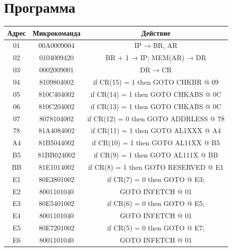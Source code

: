 \section{Программа}
\begin{center}
    \begin{tabular}{|c|c|c|}
        \hline
        Адрес & Микрокоманда & Действие                              \\
        \hline
        01    & 00A0009004   & IP → BR, AR                           \\
        \hline
        02    & 0104009420   & BR + 1 → IP; MEM(AR) → DR             \\
        \hline
        03    & 0002009001   & DR → CR                               \\
        \hline
        04    & 8109804002   & if CR(15) = 1 then GOTO CHKBR @ 09    \\
        \hline
        05    & 810C404002   & if CR(14) = 1 then GOTO CHKABS @ 0C   \\
        \hline
        06    & 810C204002   & if CR(13) = 1 then GOTO CHKABS @ 0C   \\
        \hline
        07    & 8078104002   & if CR(12) = 0 then GOTO ADDRLESS @ 78 \\
        \hline
        78    & 81A4084002   & if CR(11) = 1 then GOTO AL1XXX @ A4   \\
        \hline
        A4    & 81B5044002   & if CR(10) = 1 then GOTO AL11XX @ B5   \\
        \hline
        B5    & 81BB024002   & if CR(9) = 1 then GOTO AL111X @ BB    \\
        \hline
        BB    & 81E1014002   & if CR(8) = 1 then GOTO RESERVED @ E1  \\
        \hline
        E1    & 80E3801002   & if CR(7) = 0 then GOTO @ E3;          \\
        \hline
        E2    & 8001101040   & GOTO INFETCH @ 01                     \\
        \hline
        E3    & 80E5401002   & if CR(6) = 0 then GOTO @ E5;          \\
        \hline
        E4    & 8001101040   & GOTO INFETCH @ 01                     \\
        \hline
        E5    & 80E7201002   & if CR(5) = 0 then GOTO @ E7;          \\
        \hline
        E6    & 8001101040   & GOTO INFETCH @ 01                     \\
        \hline

\end{tabular}
\end{center}
